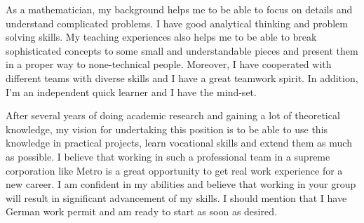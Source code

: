 \documentclass[12pt,a4paper,sans]{moderncv}        %
\begin{document}
As a mathematician, my background helps me to be able to focus on details and understand complicated problems. I have good analytical thinking and problem solving skills. My teaching experiences also helps me to be able to break sophisticated concepts to some small and understandable pieces and present them in a proper way to none-technical people. Moreover, I have cooperated with different teams with diverse skills and I have a great teamwork spirit. In addition, I’m an independent quick learner and I have the mind-set. 


After several years of doing academic research and gaining a lot of theoretical knowledge, my vision for undertaking this position is to be able to use this knowledge in practical projects, learn vocational skills and extend them as much as possible. I believe that working in such a professional team in a supreme corporation like Metro is a great opportunity to get real work experience for a new career. I am confident in my abilities and believe that working in your group will result in significant advancement of my skills. I should mention that I have German work permit and am ready to start as soon as desired.

 \vspace{3mm}
 
\makeletterclosing
\end{document}
